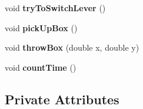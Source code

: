 \begin{DoxyCompactItemize}
void {\bfseries try\+To\+Switch\+Lever} ()
\item 
\mbox{\label{class_level_aa52fdbf5c43c826b21b640cc53d11d1b}} 
void {\bfseries pick\+Up\+Box} ()
\item 
\mbox{\label{class_level_a911bba94df90e7adabac1a5a0519ea47}} 
void {\bfseries throw\+Box} (double x, double y)
\item 
\mbox{\label{class_level_afd0bf2f408a9871d56e386d7a7dced72}} 
void {\bfseries count\+Time} ()
\end{DoxyCompactItemize}
\subsection*{Private Attributes}
